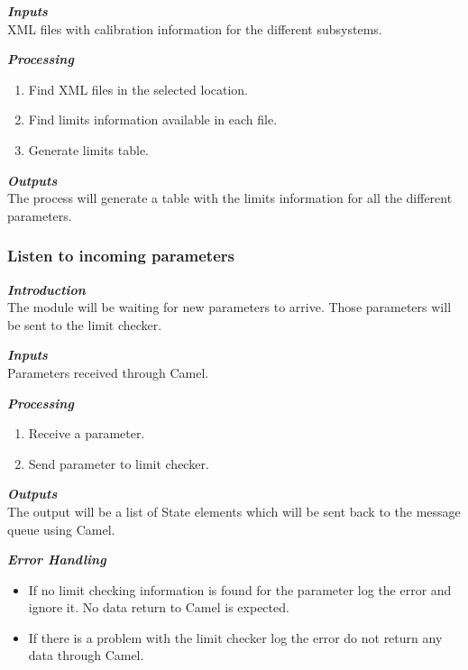 \textbf{\emph{Inputs}}\\

XML files with calibration information for the different subsystems.

\textbf{\emph{Processing}}\\
\begin{enumerate}
\item Find XML files in the selected location.
\item Find limits information available in each file.
\item Generate limits table.
\end{enumerate}

\textbf{\emph{Outputs}}\\

The process will generate a table with the limits information for all the different parameters.



\subsubsection{Listen to incoming parameters}

\textbf{\emph{Introduction}}\\
The module will be waiting for new parameters to arrive. Those parameters will be sent to the limit checker.

\textbf{\emph{Inputs}}\\

Parameters received through Camel.

\textbf{\emph{Processing}}\\
\begin{enumerate}
\item Receive a parameter.
\item Send parameter to limit checker.
\end{enumerate}

\textbf{\emph{Outputs}}\\

The output will be a list of State elements which will be sent back to the message queue using Camel.


\textbf{\emph{Error Handling}}\\
\begin{itemize}
\item If no limit checking information is found for the parameter log the error and ignore it. No data return to Camel is expected.
\item If there is a problem with the limit checker log the error do not return any data through Camel.
\end{itemize}


